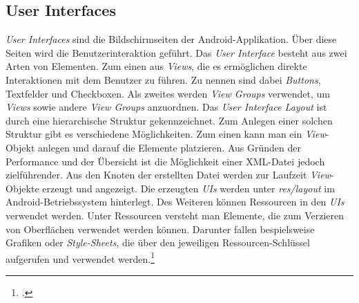 \subsection{User Interfaces}
\label{ssec:android-ui}
\textit{User Interfaces} sind die Bildschirmseiten der Android-Applikation. Über diese Seiten wird die Benutzerinteraktion geführt. Das \textit{User Interface} besteht aus zwei Arten von Elementen. Zum einen aus \textit{Views}, die es ermöglichen direkte Interaktionen mit dem Benutzer zu führen. Zu nennen sind dabei \textit{Buttons}, Textfelder und Checkboxen. Als zweites werden \textit{View Groups} verwendet, um \textit{Views} sowie andere \textit{View Groups} anzuordnen.
Das \textit{User Interface Layout} ist durch eine hierarchische Struktur gekennzeichnet. Zum Anlegen einer solchen Struktur gibt es verschiedene Möglichkeiten. Zum einen kann man ein \textit{View}-Objekt anlegen und darauf die Elemente platzieren. Aus Gründen der Performance und der Übersicht ist die Möglichkeit einer \ac{XML}-Datei jedoch zielführender. Aus den Knoten der erstellten Datei werden zur Laufzeit \textit{View}-Objekte erzeugt und angezeigt. Die erzeugten \textit{UIs} werden unter \textit{res/layout} im Android-Betriebssystem hinterlegt. Des Weiteren können Ressourcen in den \textit{UIs} verwendet werden. Unter Ressourcen versteht man Elemente, die zum Verzieren von Oberflächen verwendet werden können. Darunter fallen bespielsweise Grafiken oder \textit{Style-Sheets}, die über den jeweiligen Ressourcen-Schlüssel aufgerufen und verwendet werden.\footcite{Android-UI}
